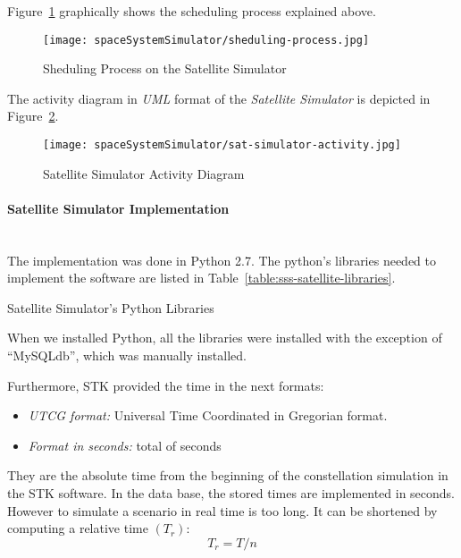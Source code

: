 Figure~\ref{fig:sss-sheduling-process} graphically shows the scheduling process explained above.


\begin{figure}[!h]
\begin{center}
\texttt{[image: spaceSystemSimulator/sheduling-process.jpg]}
\caption{Sheduling Process on the Satellite Simulator}
\label{fig:sss-sheduling-process}
\end{center}
\end{figure}


The activity diagram in \emph{UML} format of the \emph{Satellite Simulator} is
depicted in Figure~\ref{fig:sss-satellite-activity}.

\begin{figure}[!h]
\begin{center}
\texttt{[image: spaceSystemSimulator/sat-simulator-activity.jpg]}
\caption{Satellite Simulator Activity Diagram}
\label{fig:sss-satellite-activity}
\end{center}
\end{figure}

\paragraph{Satellite Simulator Implementation}
\label{par:sat-simulator-implementation}~\\

The implementation was done in Python 2.7. The python's libraries needed to
implement the software are listed in Table~\ref{table:sss-satellite-libraries}.



\begin{table}[hp]
  \centering
  {\small
  
  }
  \caption{Satellite Simulator's Python Libraries}
  \label{table:sss-satellite-libraries}
\end{table}

When we installed Python, all the libraries were installed with the exception of ``MySQLdb'', which was manually installed.

Furthermore, STK provided the time in the next formats:
\begin{itemize}
\item \emph{UTCG format:} Universal Time Coordinated in Gregorian format.
\item \emph{Format in seconds:} total of seconds
\end{itemize}
They are the absolute time from the beginning of the constellation simulation in
the STK software. In the data base, the stored times are implemented in
seconds. However to simulate a scenario in real time is too long. It can be
shortened by computing a relative time $(T_r)$:
\begin{equation}\label{eq:TR}
	T_r=T/n
\end{equation}

